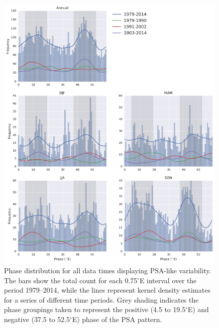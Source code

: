 \begin{figure}
\begin{center}
\includegraphics[width=0.98\columnwidth]{figures/psa/psa-phase-histogram_wave6_ERAInterim_500hPa-lat10S10Nmean-lon115E235Ezeropad_030day-runmean-anom-wrt-all_native-np20N260E.png}
\caption[Phase distribution for all data times displaying PSA-like variability]{\label{fig:phase_distribution}
Phase distribution for all data times displaying PSA-like variability. The bars show the total count for each 0.75$^{\circ}$E interval over the period 1979--2014, while the lines represent kernel density estimates for a series of different time periods. Grey shading indicates the phase groupings taken to represent the positive (4.5 to 19.5$^{\circ}$E) and negative (37.5 to 52.5$^{\circ}$E) phase of the PSA pattern.%
}
\end{center}
\end{figure}


